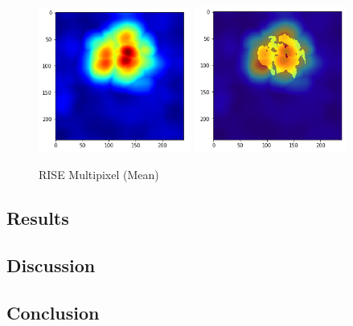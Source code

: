 \begin{figure}[H]
\centering
\caption{RISE Multipixel (Mean)}
\includegraphics[width=5cm]{chapters/04_segmentation/images/rise_multipixel_max_1-0.png}
\includegraphics[width=5cm]{chapters/04_segmentation/images/rise_multipixel_max_1-1.png}
\end{figure}




\subsection{Results}

\subsection{Discussion}

\subsection{Conclusion}
